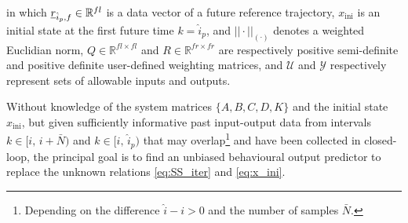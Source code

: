 in which $\underline{r}_{\hat{i}_p,f}\in\mathbb{R}^{fl}$ is a data vector of a future reference trajectory, $x_\mathrm{ini}$ is an initial state at the first future time $k=\hat{i}_p$, and $||\cdot||_{(\cdot)}$ denotes a weighted Euclidian norm, $Q\in\mathbb{R}^{fl\times fl}$ and $R\in\mathbb{R}^{fr\times fr}$ are respectively positive semi-definite and positive definite user-defined weighting matrices, and $\mathcal{U}$ and $\mathcal{Y}$ respectively represent sets of allowable inputs and outputs. %

Without knowledge of the system matrices $\{A,B,C,D,K\}$ and the initial state $x_\mathrm{ini}$, but given sufficiently informative past input-output data from  intervals $k\in[i,\,i+\bar{N})$ and $k\in[\hat{i},\,\hat{i}_p)$ that may overlap\footnote{Depending on the difference $\hat{i}-i>0$ and the number of samples $\bar{N}$.} and have been collected in closed-loop, the principal goal is to find an unbiased behavioural output predictor to replace the unknown relations \eqref{eq:SS_iter} and \eqref{eq:x_ini}.